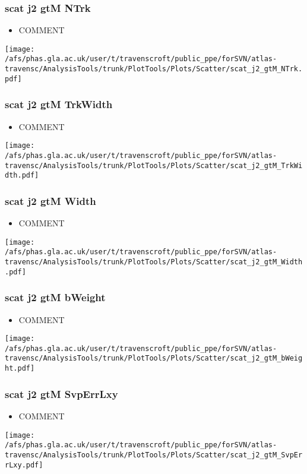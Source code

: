 \documentclass{beamer}
\begin{document}
\begin{frame}
\frametitle{scat j2 gtM NTrk}
\begin{itemize}
\item COMMENT
\end{itemize}
\begin{center}
\texttt{[image: /afs/phas.gla.ac.uk/user/t/travenscroft/public\_ppe/forSVN/atlas-travensc/AnalysisTools/trunk/PlotTools/Plots/Scatter/scat\_j2\_gtM\_NTrk.pdf]}
\end{center}
\end{frame}

\begin{frame}
\frametitle{scat j2 gtM TrkWidth}
\begin{itemize}
\item COMMENT
\end{itemize}
\begin{center}
\texttt{[image: /afs/phas.gla.ac.uk/user/t/travenscroft/public\_ppe/forSVN/atlas-travensc/AnalysisTools/trunk/PlotTools/Plots/Scatter/scat\_j2\_gtM\_TrkWidth.pdf]}
\end{center}
\end{frame}

\begin{frame}
\frametitle{scat j2 gtM Width}
\begin{itemize}
\item COMMENT
\end{itemize}
\begin{center}
\texttt{[image: /afs/phas.gla.ac.uk/user/t/travenscroft/public\_ppe/forSVN/atlas-travensc/AnalysisTools/trunk/PlotTools/Plots/Scatter/scat\_j2\_gtM\_Width.pdf]}
\end{center}
\end{frame}

\begin{frame}
\frametitle{scat j2 gtM bWeight}
\begin{itemize}
\item COMMENT
\end{itemize}
\begin{center}
\texttt{[image: /afs/phas.gla.ac.uk/user/t/travenscroft/public\_ppe/forSVN/atlas-travensc/AnalysisTools/trunk/PlotTools/Plots/Scatter/scat\_j2\_gtM\_bWeight.pdf]}
\end{center}
\end{frame}

\begin{frame}
\frametitle{scat j2 gtM SvpErrLxy}
\begin{itemize}
\item COMMENT
\end{itemize}
\begin{center}
\texttt{[image: /afs/phas.gla.ac.uk/user/t/travenscroft/public\_ppe/forSVN/atlas-travensc/AnalysisTools/trunk/PlotTools/Plots/Scatter/scat\_j2\_gtM\_SvpErrLxy.pdf]}
\end{center}
\end{frame}
\end{document}
